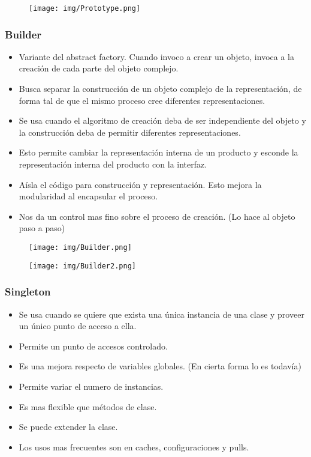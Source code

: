 \begin{figure}[!htb]
    \centering
    \texttt{[image: img/Prototype.png]}
\end{figure}

\subsubsection*{Builder}
\begin{itemize}
\item Variante del abstract factory. Cuando invoco a crear un objeto, invoca a la creación de cada parte del objeto complejo.
\item Busca separar la construcción de un objeto complejo de la representación, de forma tal de que el mismo proceso cree diferentes representaciones.
\item Se usa cuando el algoritmo de creación deba de ser independiente del objeto y la construcción deba de permitir diferentes representaciones.
\item Esto permite cambiar la representación interna de un producto y esconde la representación interna del producto con la interfaz.
\item Aísla el código para construcción y representación. Esto mejora la modularidad al encapsular el proceso.
\item Nos da un control mas fino sobre el proceso de creación. (Lo hace al objeto paso a paso)
\end{itemize}

\begin{figure}[!htb]
    \centering
    \texttt{[image: img/Builder.png]}
\end{figure}

\begin{figure}[!htb]
    \centering
    \texttt{[image: img/Builder2.png]}
\end{figure}

\subsubsection*{Singleton}
\begin{itemize}
\item Se usa cuando se quiere que exista una única instancia de una clase y proveer un único punto de acceso a ella.
\item Permite un punto de accesos controlado.
\item Es una mejora respecto de variables globales. (En cierta forma lo es todavía)
\item Permite variar el numero de instancias.
\item Es mas flexible que métodos de clase.
\item Se puede extender la clase.
\item Los usos mas frecuentes son en caches, configuraciones y pulls.
\end{itemize}


